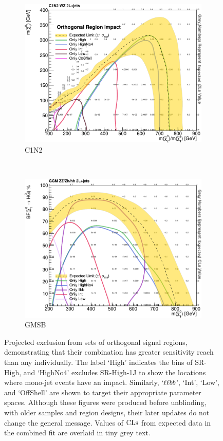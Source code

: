 \begin{figure}[tp]
\centering
\begin{subfigure}{0.7\textwidth}
\centering
\includegraphics[width=\textwidth]{figures/2ljets_fit_multi_contours_c1n2.pdf}
\caption{C1N2}
\end{subfigure}
\\
\begin{subfigure}{0.7\textwidth}
\centering
\includegraphics[width=\textwidth]{figures/2ljets_fit_multi_contours_gmsb.pdf}
\caption{GMSB}
\end{subfigure}
\caption[
Projected exclusion from sets of orthogonal signal regions
]{%
Projected exclusion from sets of orthogonal signal regions, demonstrating that
their combination has greater sensitivity reach than any individually.
The label `High' indicates the bins of SR-High, and `HighNo4' excludes
SR-High-1J to show the locations where mono-jet events have an impact.
Similarly, `$\ell\ell bb$', `Int', `Low', and `OffShell' are shown to target their
appropriate parameter spaces.
Although these figures were produced before unblinding, with older samples and
region designs, their later updates do not change the general message.
Values of $\mathrm{CLs}$ from expected data in the combined fit are overlaid in tiny
grey text.
}
\label{fig:2ljets_fit_multi_contours}
\end{figure}

